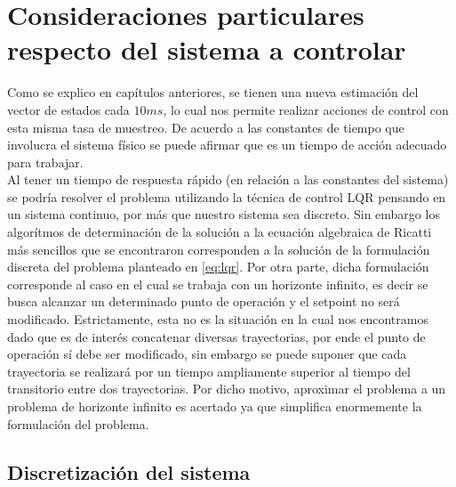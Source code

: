 \documentclass[main]{subfiles}
\begin{document}
\section{Consideraciones particulares respecto del sistema a controlar}

Como se explico en cap\'itulos anteriores, se tienen una nueva estimaci\'on del vector de estados cada $10 ms$, lo cual nos permite realizar acciones de control con esta misma tasa de muestreo. De acuerdo a las constantes de tiempo que involucra el sistema f\'isico se puede afirmar que es un tiempo de acci\'on adecuado para trabajar.\\

Al tener un tiempo de respuesta r\'apido (en relaci\'on a las constantes del sistema) se podr\'ia resolver el problema utilizando la t\'ecnica de control LQR pensando en un sistema continuo, por m\'as que nuestro sistema sea discreto. Sin embargo los algor\'itmos de determinaci\'on de la soluci\'on a la ecuaci\'on algebraica de Ricatti m\'as sencillos que se encontraron corresponden a la soluci\'on de la formulaci\'on discreta del problema planteado en \ref{eq:lqr}. Por otra parte, dicha formulaci\'on corresponde al caso en el cual se trabaja con un horizonte infinito, es decir se busca alcanzar un determinado punto de operaci\'on y el setpoint no ser\'a modificado. Estrictamente, esta no es la situaci\'on en la cual nos encontramos dado que es de inter\'es concatenar diversas trayectorias, por ende el punto de operaci\'on s\'i debe ser modificado, sin embargo se puede suponer que cada trayectoria se realizar\'a por un tiempo ampliamente superior al tiempo del transitorio entre dos trayectorias. Por dicho motivo, aproximar el problema a un problema de horizonte infinito es acertado ya que simplifica enormemente la formulaci\'on del problema.

\subsection{Discretizaci\'on del sistema}
\end{document}
